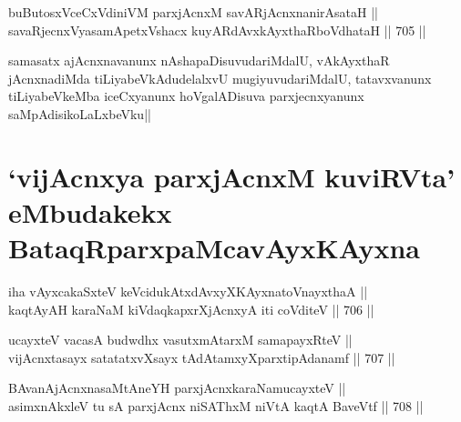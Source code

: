 
\begin{shl}
buButosxVceCxVdiniVM parxjAcnxM savARjAcnxnanirAsataH || \\
savaRjecnxVyasamApetxVshacx kuyARdAvxkAyxthaRboVdhataH ||  705 ||  
\end{shl}

\begin{artha} 
samasatx ajAcnxnavanunx nAshapaDisuvudariMdalU, vAkAyxthaR 
jAcnxnadiMda tiLiyabeVkAdudelalxvU mugiyuvudariMdalU, tatavxvanunx 
tiLiyabeVkeMba iceCxyanunx hoVgalADisuva parxjecnxyanunx 
saMpAdisikoLaLxbeVku||
\end{artha}


\section*{`vijAcnxya parxjAcnxM kuviRVta' eMbudakekx 
BataqRparxpaMcavAyxKAyxna}

\begin{shl}
iha vAyxcakaSxteV keVcidukAtxdAvxyXKAyxnatoV\s nayxthaA || \\
kaqtAyAH karaNaM kiVdaqkapxrXjAcnxyA iti coVditeV ||  706 ||  
\end{shl}
				
\begin{shl}
ucayxteV vacasA budwdhx vasutxmAtarxM samapayxRteV || \\
vijAcnxtasayx satatatxvXsayx tAdAtamxyXparxtipAdanamf ||  707 ||  
\end{shl}
				
\begin{shl}
BAvanAjAcnxnasaMtAneYH parxjAcnxkaraNamucayxteV ||  \\
asimxnAkxleV tu sA parxjAcnx niSAThxM niVtA kaqtA BaveVtf ||  708 ||  
\end{shl}

